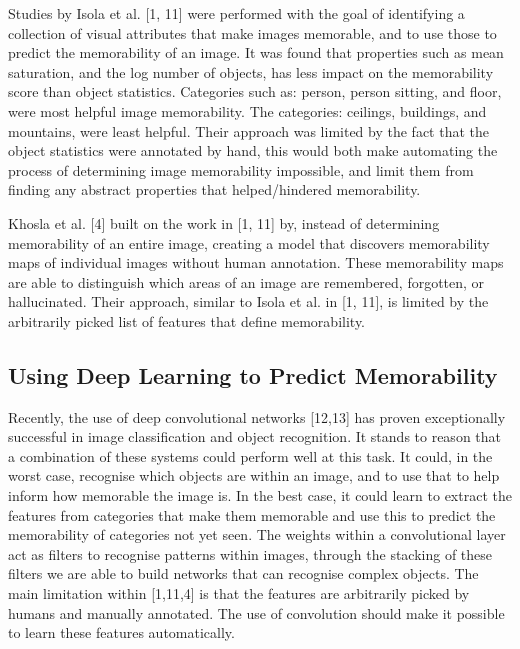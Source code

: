 \documentclass{UoYCSproject}
\begin{document}
Studies by Isola et al. [1, 11] were performed with the goal of identifying a collection of visual attributes that make images memorable, and to use those to predict the memorability of an image. It was found that properties such as mean saturation, and the log number of objects, has less impact on the memorability score than object statistics. 
Categories such as: person, person sitting, and floor, were most helpful image memorability. The categories: ceilings, buildings, and mountains, were least helpful. Their approach was limited by the fact that the object statistics were annotated by hand, this would both make automating the process of determining image memorability impossible, and limit them from finding any abstract properties that helped/hindered memorability.

Khosla et al. [4] built on the work in [1, 11] by, instead of determining memorability of an entire image, creating a model that discovers memorability maps of individual images without human annotation. These memorability maps are able to distinguish which areas of an image are remembered, forgotten, or hallucinated. Their approach, similar to Isola et al. in [1, 11], is limited by the arbitrarily picked list of features that define memorability.

\subsection{Using Deep Learning to Predict Memorability}

Recently, the use of deep convolutional networks [12,13] has proven exceptionally successful in image classification and object recognition. It stands to reason that a combination of these systems could perform well at this task. It could, in the worst case, recognise which objects are within an image, and to use that to help inform how memorable the image is. In the best case, it could learn to extract the features from categories that make them memorable and use this to predict the memorability of categories not yet seen. The weights within a convolutional layer act as filters to recognise patterns within images, through the stacking of these filters we are able to build networks that can recognise complex objects. The main limitation within [1,11,4] is that the features are arbitrarily picked by humans and manually annotated. The use of convolution should make it possible to learn these features automatically.   
\end{document}
